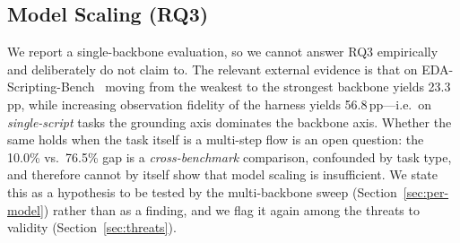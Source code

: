\subsection{Model Scaling (RQ3)}
\label{sec:model-scaling}

We report a single-backbone evaluation, so we cannot answer RQ3 empirically and
deliberately do not claim to. The relevant external evidence is that on
EDA-Scripting-Bench~\cite{zhu2026edascript} moving from the weakest to the
strongest backbone yields 23.3\,pp, while increasing observation fidelity of the
harness yields 56.8\,pp---i.e.\ on \emph{single-script} tasks the grounding axis
dominates the backbone axis. Whether the same holds when the task itself is a
multi-step flow is an open question: the 10.0\% vs.\ 76.5\% gap is a
\emph{cross-benchmark} comparison, confounded by task type, and therefore cannot
by itself show that model scaling is insufficient. We state this as a hypothesis
to be tested by the multi-backbone sweep (Section~\ref{sec:per-model}) rather than
as a finding, and we flag it again among the threats to validity
(Section~\ref{sec:threats}).
